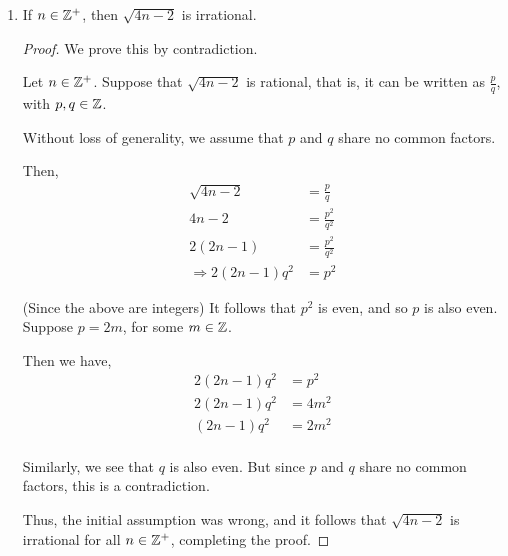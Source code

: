 \begin{enumerate}
\begin{proof}
        And,
        \begin{align*}
            \textrm{RHS} &= 2^n \times 1 \times 3 \times \dots \times (2n-1) \\
            &= 2^n \times \left( \frac{1 \times 2 \times 3 \times \dots \times 2n}{2 \times 4 \times 6 \times \dots \times 2n} \right) \\
            &= (2n)! \times\frac
            {\overbrace{2 \times 2 \times \dots \times 2}^{n \textrm{ terms}}}
            {\underbrace{2 \times 4 \times 6 \times \dots \times 2n}_{n \textrm{ terms}}} \\
            &= (2n)! \times \frac{1}{1 \times 2 \times 3 \times \dots \times n} \\
            &= \frac{(2n)!}{n!} \\
            &= \textrm{LHS}
        \end{align*}

        The result follows, thus completing the proof.
    \end{proof}

\item
    \begin{theorem}
        If $n \in \mathbb{Z}^+$, then $\sqrt{4n-2}$ is irrational.
    \end{theorem}
    \begin{proof}
        We prove this by contradiction.

        Let $n \in \mathbb{Z}^+$.
        Suppose that $\sqrt{4n-2}$ is rational, that is, it can be
        written as $\frac{p}{q}$, with $p, q \in \mathbb{Z}$.

        Without loss of generality, we assume that $p$ and $q$ share no
        common factors.

        Then,
        \begin{align*}
            \sqrt{4n-2} &= \frac{p}{q} \\
            4n-2 &= \frac{p^2}{q^2} \\
            2(2n-1) &= \frac{p^2}{q^2} \\
            \Rightarrow 2(2n-1)q^2 &= p^2
        \end{align*}

        (Since the above are integers) It follows that $p^2$ is even,
        and so $p$ is also even.
        Suppose $p = 2m$, for some $m \in \mathbb{Z}$.

        Then we have,
        \begin{align*}
            2(2n-1)q^2 &= p^2 \\
            2(2n-1)q^2 &= 4m^2 \\
            (2n-1)q^2 &= 2m^2 \\
        \end{align*}

        Similarly, we see that $q$ is also even.
        But since $p$ and $q$ share no common factors, this is a
        contradiction.

        Thus, the initial assumption was wrong, and it follows that
        $\sqrt{4n-2}$ is irrational for all $n \in \mathbb{Z}^+$, completing
        the proof.
    \end{proof}
\end{enumerate}
